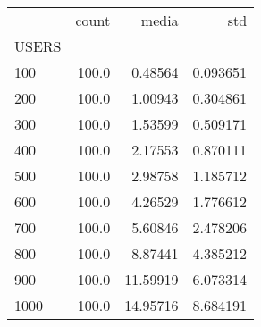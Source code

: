 \begin{tabular}{lrrr}
\toprule
{} &  count &     media &       std \\
USERS &        &           &           \\
\midrule
100   &  100.0 &   0.48564 &  0.093651 \\
200   &  100.0 &   1.00943 &  0.304861 \\
300   &  100.0 &   1.53599 &  0.509171 \\
400   &  100.0 &   2.17553 &  0.870111 \\
500   &  100.0 &   2.98758 &  1.185712 \\
600   &  100.0 &   4.26529 &  1.776612 \\
700   &  100.0 &   5.60846 &  2.478206 \\
800   &  100.0 &   8.87441 &  4.385212 \\
900   &  100.0 &  11.59919 &  6.073314 \\
1000  &  100.0 &  14.95716 &  8.684191 \\
\bottomrule
\end{tabular}
